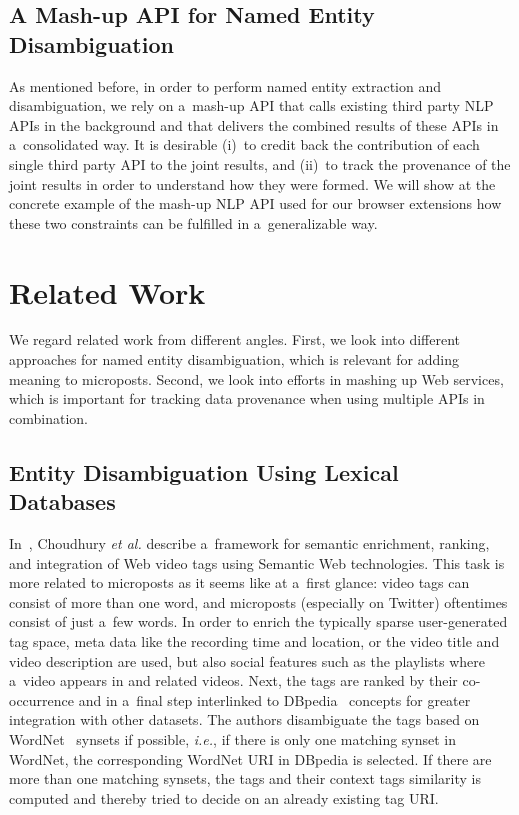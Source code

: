 \subsection{A Mash-up API for Named Entity Disambiguation}

As mentioned before, in order to perform named entity extraction
and disambiguation, we rely on a~mash-up API
that calls existing third party NLP APIs in the background
and that delivers the combined results of these APIs
in a~consolidated way.
It is  desirable
(i)~to credit back the contribution of each single third party API
to the joint results, and
(ii)~to track the provenance of the joint results
in order to understand how they were formed.
We will show at the concrete example of the mash-up NLP API
used for our browser extensions how these two constraints
can be fulfilled in a~generalizable way.

\section{Related Work}\label{sec:related}

We regard related work from different angles.
First, we look into different approaches
for named entity disambiguation,
which is relevant for adding meaning to microposts.
Second, we look into efforts in mashing up Web services,
which is important for tracking data provenance
when using multiple APIs in combination.

\subsection{Entity Disambiguation Using Lexical Databases}

In~\cite{choudhury2009youtubetags},
Choudhury \emph{et al.} describe a~framework for
semantic enrichment, ranking, and integration
of Web video tags using Semantic Web technologies.
This task is more related to microposts
as it seems like at a~first glance:
video tags can consist of more than one word,
and microposts (especially on Twitter) oftentimes consist
of just a~few words.
In order to enrich the typically sparse
user-generated tag space,
meta data like the recording time and location,
or the video title and video description are used,
but also social features such as the playlists
where a~video appears in and related videos.
Next, the tags are ranked by their co-occurrence
and in a~final step interlinked to DBpedia~\cite{auer2007dbpedia}
concepts for greater integration with other datasets.
The authors disambiguate the tags based on
WordNet~\cite{miller1995wordnet,fellbaum1998wordnet}
synsets if possible, \emph{i.e.},
if there is only one matching synset in WordNet,
the corresponding WordNet URI in DBpedia is selected.
If there are more than one matching synsets,
the tags and their context tags similarity is computed
and thereby tried to decide on an already existing tag URI.

